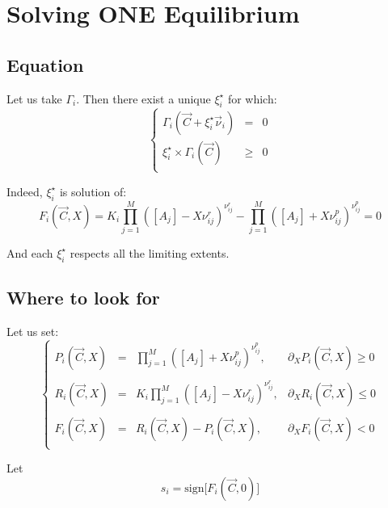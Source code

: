 \documentclass[aps,12pt]{revtex4}
\begin{document}
\section{Solving ONE Equilibrium}

\subsection{Equation}
Let us take $\Gamma_i$.
Then there exist a unique $\xi_i^\star$ for which:
\begin{equation}
\left\lbrace
\begin{array}{rcl}
	\Gamma_i(\vec{C} + \xi_i^\star \vec{\nu}_i ) & = & 0\\
	 \xi_i^\star \times \Gamma_i(\vec{C}) &\geq  &0\\
\end{array}
\right.
\end{equation}
 
Indeed, $\xi_i^\star$ is solution of:
\begin{equation}
	 F_i(\vec{C},X) =  K_i \prod_{j=1}^{M} \left([A_j] - X \nu^r_{ij}\right)^{\nu^r_{ij}} 
	- \prod_{j=1}^{M} \left([A_j] + X \nu^p_{ij} \right)^{\nu^p_{ij}} = 0
\end{equation} 

And each $\xi_i^\star$ respects all the limiting extents.

\subsection{Where to look for}
Let us set:
\begin{equation}
\left\lbrace
\begin{array}{rcll}
	P_i(\vec{C},X) & = & \displaystyle \prod_{j=1}^{M} \left([A_j] + X \nu^p_{ij} \right)^{\nu^p_{ij}}, & \partial_X P_i(\vec{C},X) \geq 0 \\
	\\
	R_i(\vec{C},X) & = & \displaystyle K_i \prod_{j=1}^{M} \left([A_j] - X \nu^r_{ij}\right)^{\nu^r_{ij}}, & \partial_X R_i(\vec{C},X) \leq 0 \\
	\\
	 F_i(\vec{C},X) & = & R_i(\vec{C},X)  - P_i(\vec{C},X), & \partial_X F_i(\vec{C},X) < 0\\
\end{array}
\right.
\end{equation}

Let
\begin{equation}
	s_i = \mathrm{sign}\lbrack F_i(\vec{C},0) \rbrack
\end{equation}
\end{document}
